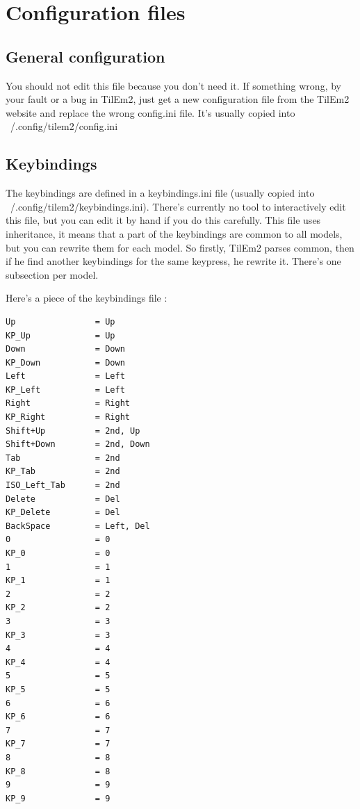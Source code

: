 \documentclass[10pt]{report}
\begin{document}
\chapter{Configuration files}
\section{General configuration}
You should not edit this file because you don't need it.\newline
If something wrong, by your fault or a bug in TilEm2, just get a new configuration file from the TilEm2 website and replace the wrong config.ini file.\newline
It's usually copied into ~/.config/tilem2/config.ini\newline
\section{Keybindings}
The keybindings are defined in a keybindings.ini file (usually copied into ~/.config/tilem2/keybindings.ini).\newline
There's currently no tool to interactively edit this file, but you can edit it by hand if you do this carefully.\newline
This file uses inheritance, it means that a part of the keybindings are common to all models, but you can rewrite them for each model.\newline
So firstly, TilEm2 parses common, then if he find another keybindings for the same keypress, he rewrite it.\newline
There's one subsection per model.\newline

Here's a piece of the keybindings file :\newline
\begin{lstlisting}
Up                = Up
KP_Up             = Up
Down              = Down
KP_Down           = Down
Left              = Left
KP_Left           = Left
Right             = Right
KP_Right          = Right
Shift+Up          = 2nd, Up
Shift+Down        = 2nd, Down
Tab               = 2nd 
KP_Tab            = 2nd 
ISO_Left_Tab      = 2nd 
Delete            = Del 
KP_Delete         = Del 
BackSpace         = Left, Del 
0                 = 0
KP_0              = 0
1                 = 1
KP_1              = 1
2                 = 2
KP_2              = 2
3                 = 3
KP_3              = 3
4                 = 4
KP_4              = 4
5                 = 5
KP_5              = 5
6                 = 6
KP_6              = 6
7                 = 7
KP_7              = 7
8                 = 8
KP_8              = 8
9                 = 9
KP_9              = 9
\end{lstlisting}
\end{document}
